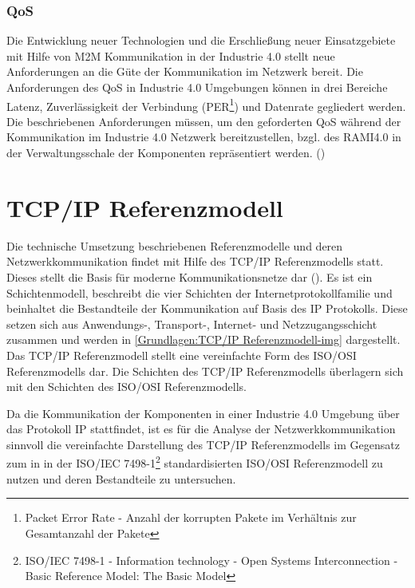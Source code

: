 \subsubsection{\ac{QoS}}
Die Entwicklung neuer Technologien und die Erschließung neuer Einsatzgebiete mit Hilfe von \ac{M2M} Kommunikation in der Industrie 4.0 stellt neue Anforderungen an die Güte der Kommunikation im Netzwerk bereit. Die Anforderungen des \ac{QoS} in Industrie 4.0 Umgebungen können in drei Bereiche Latenz, Zuverlässigkeit der Verbindung (\ac{PER}\footnote{Packet Error Rate - Anzahl der korrupten Pakete im Verhältnis zur Gesamtanzahl der Pakete}) und Datenrate gegliedert werden. Die beschriebenen Anforderungen müssen, um den geforderten \ac{QoS} während der Kommunikation im Industrie 4.0 Netzwerk bereitzustellen, bzgl. des \ac{RAMI4.0} in der Verwaltungsschale der Komponenten repräsentiert werden. (\cite{BMWiNeCon2016})

\section{\ac{TCP}/\ac{IP} Referenzmodell}
\label{Grundlagen:TCP/IP Referenzmodell}
Die technische Umsetzung beschriebenen Referenzmodelle und deren Netzwerkkommunikation findet mit Hilfe des \ac{TCP}/\ac{IP} Referenzmodells statt. Dieses stellt die Basis für moderne Kommunikationsnetze dar (\cite{sichKom2017}). Es ist ein Schichtenmodell, beschreibt die vier Schichten der Internetprotokollfamilie und beinhaltet die Bestandteile der Kommunikation auf Basis des \ac{IP} Protokolls. Diese setzen sich aus Anwendungs-, Transport-, Internet- und Netzzugangsschicht zusammen und werden in \autoref{Grundlagen:TCP/IP Referenzmodell-img} dargestellt. Das \ac{TCP}/\ac{IP} Referenzmodell stellt eine vereinfachte Form des \ac{ISO}/\ac{OSI} Referenzmodells dar. Die Schichten des \ac{TCP}/\ac{IP} Referenzmodells überlagern sich mit den Schichten des \ac{ISO}/\ac{OSI} Referenzmodells.

Da die Kommunikation der Komponenten in einer Industrie 4.0 Umgebung über das Protokoll \ac{IP} stattfindet, ist es für die Analyse der Netzwerkkommunikation sinnvoll die vereinfachte Darstellung des \ac{TCP}/\ac{IP} Referenzmodells im Gegensatz zum in in der \ac{ISO}/\ac{IEC} 7498-1\footnote{ISO/IEC 7498-1 - Information technology - Open Systems Interconnection - Basic Reference Model: The Basic Model} standardisierten \ac{ISO}/\ac{OSI} Referenzmodell zu nutzen und deren Bestandteile zu untersuchen.


